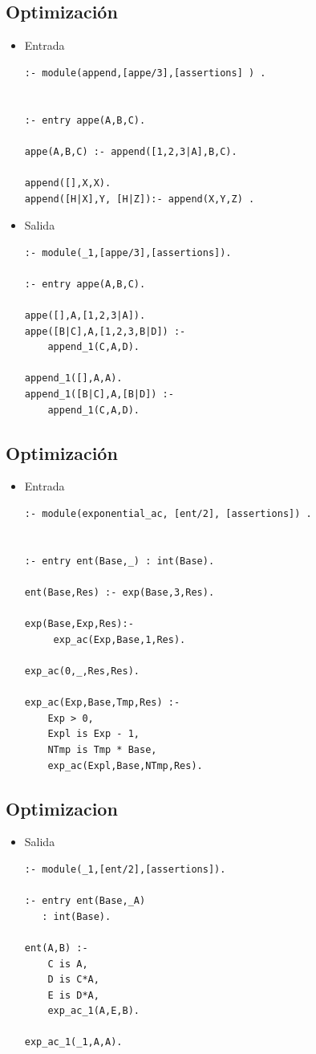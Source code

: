 \documentclass[11pt]{article}
\begin{document}
\subsection*{Optimización}
\label{sec:org5639fc4}
\begin{itemize}
\item Entrada
\begin{verbatim}
:- module(append,[appe/3],[assertions] ) .


:- entry appe(A,B,C). 

appe(A,B,C) :- append([1,2,3|A],B,C).

append([],X,X).
append([H|X],Y, [H|Z]):- append(X,Y,Z) .
\end{verbatim}

\item Salida 
\begin{verbatim}
:- module(_1,[appe/3],[assertions]).

:- entry appe(A,B,C).

appe([],A,[1,2,3|A]).
appe([B|C],A,[1,2,3,B|D]) :-
    append_1(C,A,D).

append_1([],A,A).
append_1([B|C],A,[B|D]) :-
    append_1(C,A,D).
\end{verbatim}
\end{itemize}

\subsection*{Optimización}
\label{sec:org770212b}
\begin{itemize}
\item Entrada
\begin{verbatim}
:- module(exponential_ac, [ent/2], [assertions]) .


:- entry ent(Base,_) : int(Base).

ent(Base,Res) :- exp(Base,3,Res).

exp(Base,Exp,Res):-
     exp_ac(Exp,Base,1,Res).

exp_ac(0,_,Res,Res).

exp_ac(Exp,Base,Tmp,Res) :-
    Exp > 0,
    Expl is Exp - 1,
    NTmp is Tmp * Base,
    exp_ac(Expl,Base,NTmp,Res).
\end{verbatim}
\end{itemize}
\subsection*{Optimizacion}
\label{sec:org2b6072a}
\begin{itemize}
\item Salida 
\begin{verbatim}
:- module(_1,[ent/2],[assertions]).

:- entry ent(Base,_A)
   : int(Base).

ent(A,B) :-
    C is A,
    D is C*A,
    E is D*A,
    exp_ac_1(A,E,B).

exp_ac_1(_1,A,A).

\end{verbatim}
\end{itemize}
\end{document}
